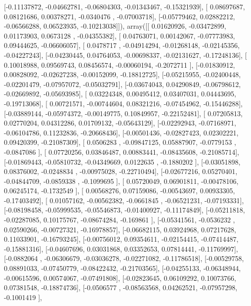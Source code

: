 \documentclass{article}
\begin{document}
       [-0.11137872, -0.04662781, -0.06804303, -0.01343467, -0.15321939],
       [ 0.08697687,  0.08121686,  0.00378271, -0.0340476 , -0.07003718],
       [-0.05779462,  0.02882212, -0.06566288,  0.06523935, -0.10213038]]), array([[ 0.01620926, -0.03472899,  0.01173903,  0.0673128 , -0.04355382],
       [ 0.04763071,  0.00142067, -0.07773983,  0.09444625, -0.06606057],
       [ 0.0478717 , -0.04914294, -0.01268148, -0.02145356, -0.04227243],
       [-0.04230445,  0.04764053, -0.00698337, -0.02131627, -0.17248136],
       [ 0.10018988,  0.09569743,  0.08456574, -0.00060194, -0.2072711 ],
       [-0.01830912,  0.00828092, -0.02627238, -0.00152099, -0.18812725],
       [-0.05215955, -0.02400448, -0.02201479, -0.07957072, -0.05032791],
       [-0.03674043,  0.04290849, -0.06798612, -0.02669892, -0.05693985],
       [ 0.03224348,  0.00495412,  0.03407031,  0.04443695, -0.19713068],
       [ 0.00721571, -0.00744604,  0.08321216, -0.07454962, -0.15446288],
       [-0.03889144, -0.05974372, -0.00149775,  0.10849957, -0.22152481],
       [ 0.07205813,  0.02770204,  0.04312286,  0.01709132, -0.05643129],
       [-0.02292943, -0.07168971, -0.06104786,  0.11232836, -0.20668436],
       [-0.00501436, -0.02827423,  0.02302221,  0.09420399, -0.21087309],
       [ 0.0506283 , -0.09847125,  0.05887907, -0.0779153 , -0.0847086 ],
       [ 0.07720256,  0.03846487,  0.00883441, -0.08435608, -0.21085714],
       [-0.01869443, -0.05810732, -0.04349669,  0.0122635 , -0.1880202 ],
       [-0.03051898,  0.08376002, -0.0248834 , -0.00975028, -0.22710494],
       [-0.02677216,  0.05270401, -0.04844709, -0.0859338 , -0.1099695 ],
       [ 0.05720049,  0.06901811, -0.00478106,  0.06245174, -0.1732549 ],
       [ 0.00568276,  0.07159086, -0.00543697,  0.00933305, -0.17403492],
       [ 0.01057162, -0.00562382, -0.0661845 , -0.06521231, -0.07193331],
       [-0.08198458, -0.05999535, -0.05546873, -0.01400927, -0.11174849],
       [-0.05211818, -0.02287085,  0.10175767, -0.08674284, -0.169861  ],
       [-0.05341561, -0.0536232 ,  0.02590266, -0.00727321, -0.16978857],
       [-0.06682115,  0.03924968,  0.07217628,  0.11033901, -0.16793245],
       [-0.00756012,  0.09354611, -0.02154415, -0.07414487, -0.15881316],
       [-0.04607696,  0.03031868,  0.03352653,  0.07814441, -0.11769997],
       [-0.0882064 , -0.06306679, -0.03036278, -0.02271082, -0.11786518],
       [-0.00529758,  0.08891033, -0.07450779, -0.08422432, -0.21703565],
       [-0.04255133, -0.06348944, -0.00615596,  0.00574067, -0.07491808],
       [-0.02823645,  0.06109292,  0.10073766,  0.07381548, -0.18874736],
       [-0.0506577 , -0.08563568,  0.04262521, -0.07957298, -0.1001419 ],
\end{document}
